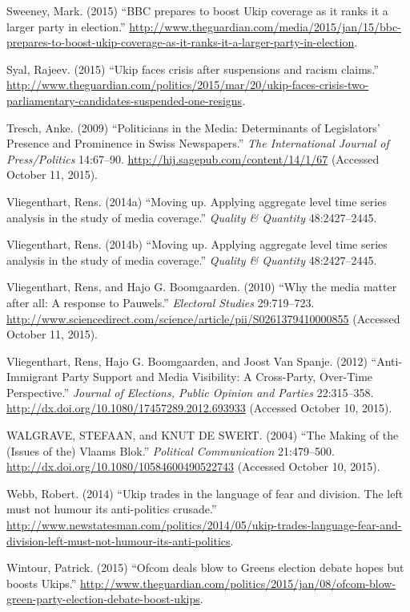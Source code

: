 \documentclass[12pt,article]{article}
\begin{document}
Sweeney, Mark. (2015) ``BBC prepares to boost Ukip coverage as it ranks
it a larger party in election.''
\url{http://www.theguardian.com/media/2015/jan/15/bbc-prepares-to-boost-ukip-coverage-as-it-ranks-it-a-larger-party-in-election}.

Syal, Rajeev. (2015) ``Ukip faces crisis after suspensions and racism
claims.''
\url{http://www.theguardian.com/politics/2015/mar/20/ukip-faces-crisis-two-parliamentary-candidates-suspended-one-resigns}.

Tresch, Anke. (2009) ``Politicians in the Media: Determinants of
Legislators' Presence and Prominence in Swiss Newspapers.'' \emph{The
International Journal of Press/Politics} 14:67--90.
\url{http://hij.sagepub.com/content/14/1/67} (Accessed October 11,
2015).

Vliegenthart, Rens. (2014a) ``Moving up. Applying aggregate level time
series analysis in the study of media coverage.'' \emph{Quality \&
Quantity} 48:2427--2445.

Vliegenthart, Rens. (2014b) ``Moving up. Applying aggregate level time
series analysis in the study of media coverage.'' \emph{Quality \&
Quantity} 48:2427--2445.

Vliegenthart, Rens, and Hajo G. Boomgaarden. (2010) ``Why the media
matter after all: A response to Pauwels.'' \emph{Electoral Studies}
29:719--723.
\url{http://www.sciencedirect.com/science/article/pii/S0261379410000855}
(Accessed October 11, 2015).

Vliegenthart, Rens, Hajo G. Boomgaarden, and Joost Van Spanje. (2012)
``Anti-Immigrant Party Support and Media Visibility: A Cross-Party,
Over-Time Perspective.'' \emph{Journal of Elections, Public Opinion and
Parties} 22:315--358.
\url{http://dx.doi.org/10.1080/17457289.2012.693933} (Accessed October
10, 2015).

WALGRAVE, STEFAAN, and KNUT DE SWERT. (2004) ``The Making of the (Issues
of the) Vlaams Blok.'' \emph{Political Communication} 21:479--500.
\url{http://dx.doi.org/10.1080/10584600490522743} (Accessed October 10,
2015).

Webb, Robert. (2014) ``Ukip trades in the language of fear and division.
The left must not humour its anti-politics crusade.''
\url{http://www.newstatesman.com/politics/2014/05/ukip-trades-language-fear-and-division-left-must-not-humour-its-anti-politics}.

Wintour, Patrick. (2015) ``Ofcom deals blow to Greens election debate
hopes but boosts Ukips.''
\url{http://www.theguardian.com/politics/2015/jan/08/ofcom-blow-green-party-election-debate-boost-ukips}.
\end{document}
